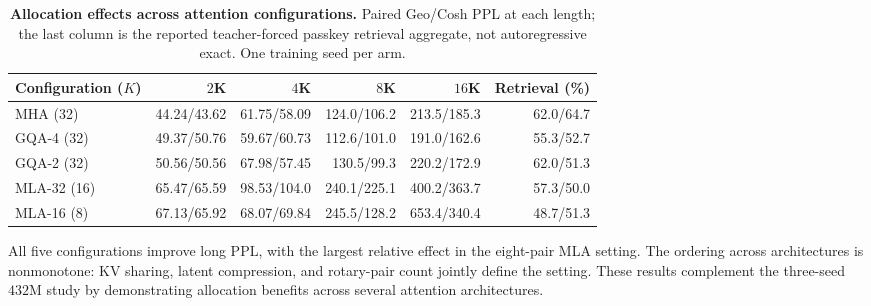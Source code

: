 \begin{table}[ht]
\centering\small
\caption{\textbf{Allocation effects across attention configurations.} Paired Geo/Cosh PPL at each length; the last column is the reported teacher-forced passkey retrieval aggregate, not autoregressive exact. One training seed per arm.}
\label{tab:compression-ablation}
\begin{tabular}{@{}lrrrrr@{}}
\toprule
Configuration ($K$) & $2$K & $4$K & $8$K & $16$K & Retrieval (\%) \\
\midrule
MHA (32) & 44.24/43.62 & 61.75/58.09 & 124.0/106.2 & 213.5/185.3 & 62.0/64.7 \\
GQA-4 (32) & 49.37/50.76 & 59.67/60.73 & 112.6/101.0 & 191.0/162.6 & 55.3/52.7 \\
GQA-2 (32) & 50.56/50.56 & 67.98/57.45 & 130.5/99.3 & 220.2/172.9 & 62.0/51.3 \\
MLA-32 (16) & 65.47/65.59 & 98.53/104.0 & 240.1/225.1 & 400.2/363.7 & 57.3/50.0 \\
MLA-16 (8) & 67.13/65.92 & 68.07/69.84 & 245.5/128.2 & 653.4/340.4 & 48.7/51.3 \\
\bottomrule
\end{tabular}
\end{table}

All five configurations improve long PPL, with the largest relative effect in the eight-pair MLA setting. The ordering across architectures is nonmonotone: KV sharing, latent compression, and rotary-pair count jointly define the setting. These results complement the three-seed $432$M study by demonstrating allocation benefits across several attention architectures.
\FloatBarrier
